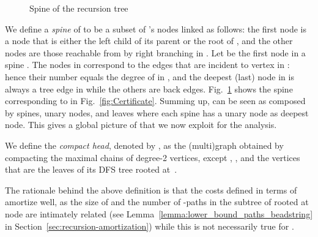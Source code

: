 \begin{figure}[t]
	\centering
{}
\caption{Spine of the recursion tree \label{fig:spine}}
\end{figure}
We define a \emph{spine} of  to be a subset of 's nodes linked
as follows: the first node is a node  that is either the left child
of its parent or the root of , and the other nodes are those
reachable from  by right branching in . Let  be the first node in a spine . The nodes in 
correspond to the edges that are incident to vertex  in
: hence their number equals the degree  of  in
, and the deepest (last) node in  is always a tree
edge in  while the others are back edges.
Fig.~\ref{fig:spine} shows the spine corresponding to  in
Fig.~\ref{fig:Certificate}. Summing up,  can be seen as composed by
spines, unary nodes, and leaves where each spine has a unary node as
deepest node. This gives a global picture of  that we now exploit
for the analysis.



We define the \emph{compact head}, denoted by \mbox{}, as the (multi)graph obtained by compacting the maximal chains
of degree-2 vertices, except , , and the vertices that are the
leaves of its DFS tree rooted at~.

The rationale behind the above definition is that the costs defined in
terms of  amortize well, as the size of  and the
number of -paths in the subtree of  rooted at node  are intimately related (see
Lemma~\ref{lemma:lower_bound_paths_beadstring} in
Section~\ref{sec:recursion-amortization}) while this is not
necessarily true for .

